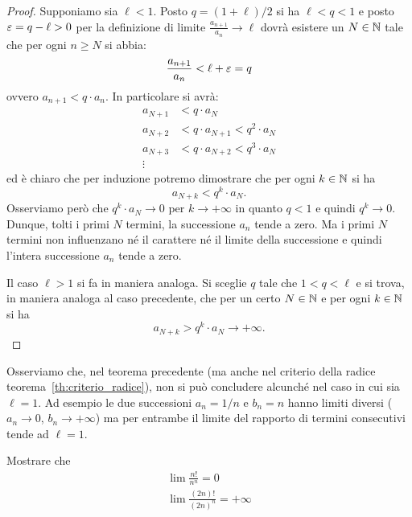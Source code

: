 \begin{proof}
Supponiamo sia $\ell<1$. Posto $q=(1+\ell)/2$ si ha $\ell < q < 1$ e posto $\varepsilon=q-\ell>0$ per la definizione di limite $\frac{a_{n+1}}{a_n}\to \ell$ dovrà esistere un $N\in \mathbb N$ tale
che per ogni $n\ge N$ si abbia:
\[
  \frac{a_{n+1}}{a_n} < \ell + \varepsilon = q
\]
ovvero $a_{n+1} < q \cdot a_n$. In particolare si avrà:
\begin{align*}
  a_{N+1} &< q \cdot a_N \\
  a_{N+2} &< q \cdot a_{N+1} < q^2\cdot a_N \\
  a_{N+3} &< q \cdot a_{N+2} < q^3\cdot a_N \\
  \vdots
\end{align*}
ed è chiaro che per induzione potremo dimostrare che per
ogni $k\in \mathbb N$ si ha
\[
  a_{N+k} < q^k\cdot a_N.
\]
Osserviamo però che $q^k \cdot a_N \to 0$ per $k\to +\infty$
in quanto $q<1$ e quindi $q^k \to 0$. Dunque, tolti i primi $N$ termini, la successione $a_n$ tende a zero. Ma i primi $N$ termini non influenzano né il carattere né il limite della successione e quindi l'intera successione $a_n$ tende a zero.

Il caso $\ell>1$ si fa in maniera analoga. Si sceglie $q$ tale
che $1<q<\ell$ e si trova, in maniera analoga al caso precedente,
che per un certo $N\in \mathbb N$ e per ogni $k\in \mathbb N$ si ha
\[
  a_{N+k} > q^k \cdot a_N \to +\infty.
\]
\end{proof}

Osserviamo che, nel teorema precedente (ma anche nel criterio della radice teorema~\ref{th:criterio_radice}),
non si può concludere alcunché nel
caso in cui sia $\ell = 1$.
Ad esempio le due successioni $a_n = 1/n$ e $b_n = n$
hanno limiti diversi ($a_n \to 0$, $b_n\to +\infty$) ma per entrambe
il limite del rapporto di termini consecutivi tende ad $\ell=1$.

\begin{exercise}
Mostrare che
\begin{gather*}
  \lim \frac{n!}{n^n} = 0 \\
  \lim \frac{(2n)!}{(2n)^n} = +\infty
\end{gather*}
\end{exercise}


